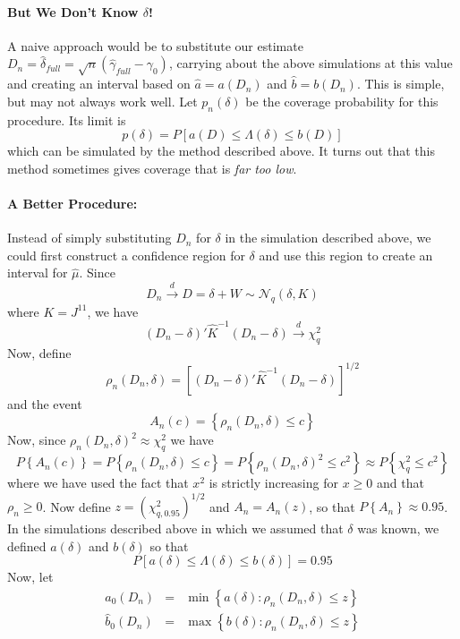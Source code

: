 \documentclass[12pt]{article}
\theoremstyle{definition}
\begin{document}
\paragraph{But We Don't Know $\delta$!} A naive approach would be to substitute our estimate $D_n = \hat{\delta}_{full} = \sqrt{n}(\hat{\gamma}_{full} - \gamma_0)$, carrying about the above simulations at this value and creating an interval based on $\hat{a} = a(D_n)$ and $\hat{b}=b(D_n)$. This is simple, but may not always work well. Let $p_n(\delta)$ be the coverage probability for this procedure. Its limit is
	$$p(\delta) = P\left[a(D)\leq \Lambda(\delta) \leq b(D)  \right]$$
which can be simulated by the method described above. It turns out that this method sometimes gives coverage that is \emph{far too low}.

\paragraph{A Better Procedure:} Instead of simply substituting $D_n$ for $\delta$ in the simulation described above, we could first construct a confidence region for $\delta$ and use this region to create an interval for $\hat{\mu}$. Since 
	$$D_n \overset{d}{\rightarrow} D = \delta + W \sim \mathcal{N}_q\left(\delta,  K\right)$$
where $K = J^{11}$, we have
	$$\left(D_n - \delta\right)' \widehat{K}^{-1}\left(D_n - \delta\right) \overset{d}{\rightarrow} \chi^2_q$$
Now, define 
	$$\rho_n(D_n,\delta) =\left[\left(D_n - \delta\right)' \widehat{K}^{-1}\left(D_n - \delta\right)\right]^{1/2}$$
and the event
	$$A_n(c) = \left\{\rho_n(D_n,\delta) \leq c  \right\}$$
Now, since $\rho_n(D_n, \delta)^2 \approx \chi^2_q$ we have
		$$P\left\{A_n(c)\right\}=P\left\{\rho_n(D_n,\delta) \leq c  \right\} = P\left\{\rho_n(D_n,\delta)^2 \leq c^2  \right\} \approx P\left\{\chi^2_q \leq c^2  \right\} 
$$
where we have used the fact that $x^2$ is strictly increasing for $x\geq0$ and that $\rho_n \geq 0$. Now define $z = (\chi^2_{q,0.95})^{1/2}$ and $A_n = A_n(z)$, so that $P\left\{A_n  \right\}\approx 0.95$. In the simulations described above in which we assumed that $\delta$ was known, we defined $a(\delta)$ and $b(\delta)$ so that
	$$P\left[ a(\delta) \leq \Lambda(\delta) \leq b(\delta) \right]= 0.95$$
Now, let
	\begin{eqnarray*}
		\widehat{a}_0(D_n)&=& \min \left\{a(\delta)\colon \rho_n(D_n, \delta) \leq z\right\}\\
		\widehat{b}_0(D_n)&=& \max \left\{b(\delta)\colon \rho_n(D_n, \delta) \leq z\right\}
\end{eqnarray*}
\end{document}
